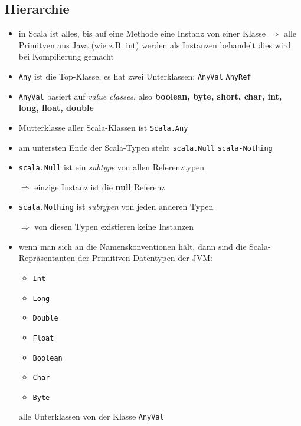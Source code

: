\subsection{Hierarchie}
\begin{itemize}
  \item in Scala ist alles, bis auf eine Methode eine Instanz von
  einer Klasse $\Rightarrow$ alle Primitven aus Java (wie \uline{z.B.} int) 
  werden als Instanzen behandelt \und dies wird bei Kompilierung gemacht
  \item \texttt{Any} ist die Top-Klasse, es hat zwei Unterklassen:
  \texttt{AnyVal} \und \texttt{AnyRef}
  \item \texttt{AnyVal}  basiert auf \textit{value classes}, also
  \textbf{boolean, byte, short, char, int, long, float, double}
  \item Mutterklasse aller Scala-Klassen ist \texttt{Scala.Any}
  \item am untersten Ende der Scala-Typen steht \texttt{scala.Null}
  \und \texttt{scala-Nothing}
  \item \texttt{scala.Null} ist ein \textit{subtype} von allen Referenztypen
  
  $\Rightarrow$ einzige Instanz ist die \textbf{null} Referenz
  \item \texttt{scala.Nothing} ist \textit{subtypen} von jeden anderen Typen
  
  $\Rightarrow$ von diesen Typen existieren keine Instanzen
  \item wenn man sich an die Namenskonventionen hält, dann sind
  die Scala-Repräsentanten der Primitiven Datentypen der JVM:
  \begin{itemize}
    \item \texttt{Int}
    \item \texttt{Long}
    \item \texttt{Double}
    \item \texttt{Float}
    \item \texttt{Boolean}
    \item \texttt{Char}
    \item \texttt{Byte}
  \end{itemize} 
  
  alle Unterklassen von der Klasse \texttt{AnyVal}
\end{itemize}


